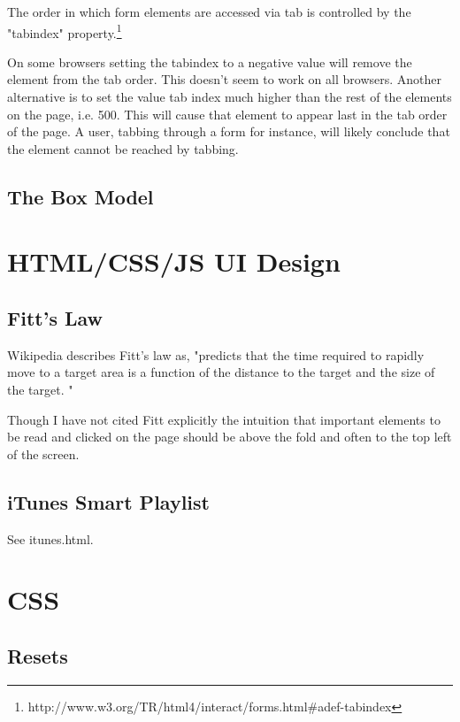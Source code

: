 \documentclass[12pt]{amsart}
\begin{document}
The order in which form elements are accessed via tab is controlled by the "tabindex" property.\footnote[1]{http://www.w3.org/TR/html4/interact/forms.html\#adef-tabindex}

On some browsers setting the tabindex to a negative value will remove the element from the tab order. This doesn't seem to work on all browsers. Another alternative is to set the value tab index much higher than the rest of the elements on the page, i.e. 500. This will cause that element to appear last in the tab order of the page. A user, tabbing through a form for instance, will likely conclude that the element cannot be reached by tabbing.

\subsection{The Box Model}



\section{HTML/CSS/JS UI Design}

\subsection{Fitt's Law}

Wikipedia describes Fitt's law as, "predicts that the time required to rapidly move to a target area is a function of the distance to the target and the size of the target. "

Though I have not cited Fitt explicitly the intuition that important elements to be read and clicked on the page should be above the fold and often to the top left of the screen.

\subsection{iTunes Smart Playlist}

See itunes.html.




\section{CSS}

\subsection{Resets}
\end{document}
